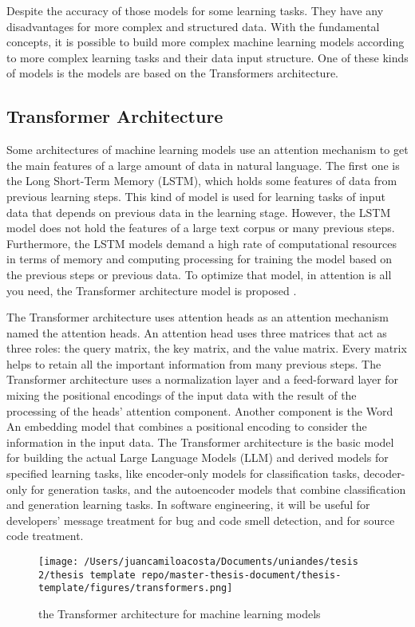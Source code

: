 Despite the accuracy of those models for some learning tasks. They have any disadvantages for more complex and structured data. With the fundamental concepts, it is possible to build more complex machine learning models according to more complex learning tasks and their data input structure. One of these kinds of models is the models are based on the Transformers architecture.

\subsection{Transformer Architecture}
Some architectures of machine learning models use an attention mechanism to get the main features of a large amount of data in natural language. The first one is the Long Short-Term Memory (LSTM), which holds some features of data from previous learning steps. This kind of model is used for learning tasks of input data that depends on previous data in the learning stage. However, the LSTM model does not hold the features of a large text corpus or many previous steps. Furthermore, the LSTM models demand a high rate of computational resources in terms of memory and computing processing for training the model based on the previous steps or previous data. To optimize that model, in attention is all you need, the Transformer architecture model is proposed \citet{attention_is_all_you_need}.

The Transformer architecture uses attention heads as an attention mechanism named the attention heads. An attention head uses three matrices that act as three roles: the query matrix, the key matrix, and the value matrix. Every matrix helps to retain all the important information from many previous steps. The Transformer architecture uses a normalization layer and a feed-forward layer for mixing the positional encodings of the input data with the result of the processing of the heads' attention component. Another component is the Word 
An embedding model that combines a positional encoding to consider the information in the input data.
The Transformer architecture is the basic model for building the actual Large Language Models (LLM) and derived models for specified learning tasks, like encoder-only models for classification tasks, decoder-only for generation tasks, and the autoencoder models that combine classification and generation learning tasks.
In software engineering, it will be useful for developers' message treatment for bug and code smell detection, and for source code treatment.

    \begin{figure}[H]
    \centering
    \texttt{[image: /Users/juancamiloacosta/Documents/uniandes/tesis 2/thesis template repo/master-thesis-document/thesis-template/figures/transformers.png]}
    \caption{the Transformer architecture for machine learning models \citet{attention_is_all_you_need} }
    \label{fig:word-embedding}
    \end{figure}

   






